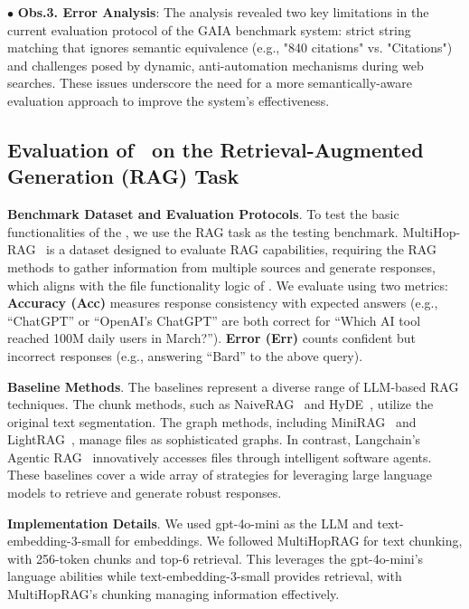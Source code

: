 $\bullet$ \textbf{Obs.3. Error Analysis}: The analysis revealed two key limitations in the current evaluation protocol of the GAIA benchmark system: strict string matching that ignores semantic equivalence (e.g., "840 citations" vs. "Citations") and challenges posed by dynamic, anti-automation mechanisms during web searches. These issues underscore the need for a more semantically-aware evaluation approach to improve the system's effectiveness.

\subsection{Evaluation of \model\ on the Retrieval-Augmented Generation (RAG) Task}
\textbf{Benchmark Dataset and Evaluation Protocols}.
To test the basic functionalities of the \model, we use the RAG task as the testing benchmark. MultiHop-RAG~\cite{MultiHop-RAG} is a dataset designed to evaluate RAG capabilities, requiring the RAG methods to gather information from multiple sources and generate responses, which aligns with the file functionality logic of \model. We evaluate using two metrics: \textbf{Accuracy (Acc)} measures response consistency with expected answers (e.g., ``ChatGPT'' or ``OpenAI's ChatGPT'' are both correct for ``Which AI tool reached 100M daily users in March?''). \textbf{Error (Err)} counts confident but incorrect responses (e.g., answering ``Bard'' to the above query).

\noindent \textbf{Baseline Methods}.
The baselines represent a diverse range of LLM-based RAG techniques. The chunk methods, such as NaiveRAG~\cite{mao2020generation} and HyDE~\cite{gao2022precise}, utilize the original text segmentation. The graph methods, including MiniRAG~\cite{fan2025minirag} and LightRAG~\cite{guo2024lightrag}, manage files as sophisticated graphs. In contrast, Langchain's Agentic RAG~\cite{langchain2023} innovatively accesses files through intelligent software agents. These baselines cover a wide array of strategies for leveraging large language models to retrieve and generate robust responses.

\textbf{Implementation Details}.
We used gpt-4o-mini \cite{openai2023gpt4} as the LLM and text-embedding-3-small for embeddings. We followed MultiHopRAG \cite{MultiHop-RAG} for text chunking, with 256-token chunks and top-6 retrieval. This leverages the gpt-4o-mini's language abilities while text-embedding-3-small provides retrieval, with MultiHopRAG's chunking managing information effectively.


